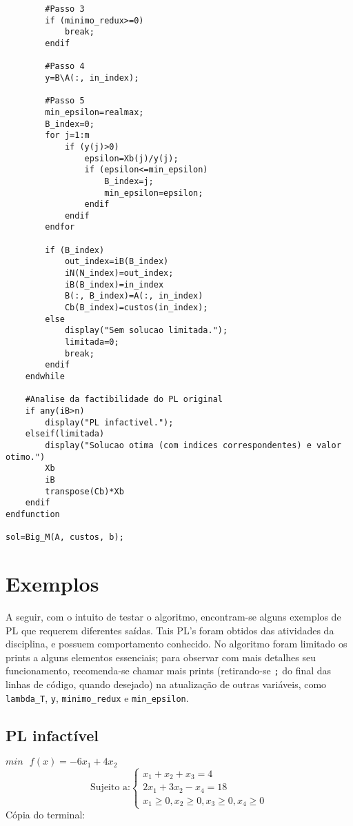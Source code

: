 \documentclass[]{article}
\begin{document}
\begin{lstlisting}
        #Passo 3
        if (minimo_redux>=0)
            break;
        endif
        
        #Passo 4
        y=B\A(:, in_index);
        
        #Passo 5
        min_epsilon=realmax;
        B_index=0;
        for j=1:m
            if (y(j)>0)
                epsilon=Xb(j)/y(j);
                if (epsilon<=min_epsilon)
                    B_index=j;
                    min_epsilon=epsilon;
                endif
            endif
        endfor
        
        if (B_index)
            out_index=iB(B_index)
            iN(N_index)=out_index;
            iB(B_index)=in_index
            B(:, B_index)=A(:, in_index)
            Cb(B_index)=custos(in_index);
        else
            display("Sem solucao limitada.");
            limitada=0;
            break;
        endif
    endwhile
    
    #Analise da factibilidade do PL original
    if any(iB>n)
        display("PL infactivel.");
    elseif(limitada)
        display("Solucao otima (com indices correspondentes) e valor otimo.")
        Xb
        iB
        transpose(Cb)*Xb
    endif
endfunction

sol=Big_M(A, custos, b);
\end{lstlisting}
\section{Exemplos}
A seguir, com o intuito de testar o algoritmo, encontram-se alguns exemplos de PL que requerem diferentes saídas. Tais PL's foram obtidos das atividades da disciplina, e possuem comportamento conhecido. No algoritmo foram limitado os prints a alguns elementos essenciais; para observar com mais detalhes seu funcionamento, recomenda-se chamar mais prints (retirando-se \verb+;+ do final das linhas de código, quando desejado) na atualização de outras variáveis, como \verb+lambda_T+, \verb+y+, \verb+minimo_redux+ e \verb+min_epsilon+.
\subsection{PL infactível}
$min\text{ }f(x)=-6x_1+4x_2$
\[
\text{Sujeito a:}\left\{
\begin{array}{l}
x_1+x_2+x_3=4\\
2x_1+3x_2-x_4=18\\
x_1\geq 0, x_2\geq 0, x_3\geq 0, x_4\geq 0
\end{array}
\right.
\]
Cópia do terminal:
\end{document}
